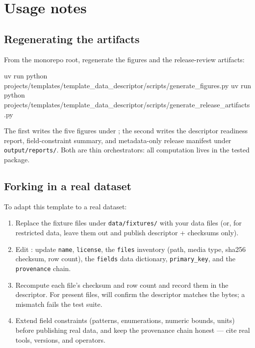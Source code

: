 \documentclass[
]{article}
\newenvironment{Shaded}{}{}
\newcommand{\ExtensionTok}[1]{#1}
\newcommand{\NormalTok}[1]{#1}
\providecommand{\tightlist}{%
  \setlength{\itemsep}{0pt}\setlength{\parskip}{0pt}}
\begin{document}
\newpage

\section{Usage notes}\label{sec:usage}

\subsection{Regenerating the
artifacts}\label{regenerating-the-artifacts}

From the monorepo root, regenerate the figures and the release-review
artifacts:

\begin{Shaded}
\begin{Highlighting}[]
\ExtensionTok{uv}\NormalTok{ run python projects/templates/template\_data\_descriptor/scripts/generate\_figures.py}
\ExtensionTok{uv}\NormalTok{ run python projects/templates/template\_data\_descriptor/scripts/generate\_release\_artifacts.py}
\end{Highlighting}
\end{Shaded}

The first writes the five figures under ;
the second writes the descriptor readiness report, field-constraint
summary, and metadata-only release manifest under
\texttt{output/reports/}. Both are thin orchestrators: all computation
lives in the tested  package.

\subsection{Forking in a real dataset}\label{forking-in-a-real-dataset}

To adapt this template to a real dataset:

\begin{enumerate}
\def\labelenumi{\arabic{enumi}.}
\tightlist
\item
  Replace the fixture files under \texttt{data/fixtures/} with your data
  files (or, for restricted data, leave them out and publish descriptor
  + checksums only).
\item
  Edit : update \texttt{name},
  \texttt{license}, the \texttt{files} inventory (path, media type,
  sha256 checksum, row count), the \texttt{fields} data dictionary,
  \texttt{primary\_key}, and the \texttt{provenance} chain.
\item
  Recompute each file's checksum and row count and record them in the
  descriptor. For present files, 
  will confirm the descriptor matches the bytes; a mismatch fails the
  test suite.
\item
  Extend field constraints (patterns, enumerations, numeric bounds,
  units) before publishing real data, and keep the provenance chain
  honest --- cite real tools, versions, and operators.
\end{enumerate}
\end{document}
